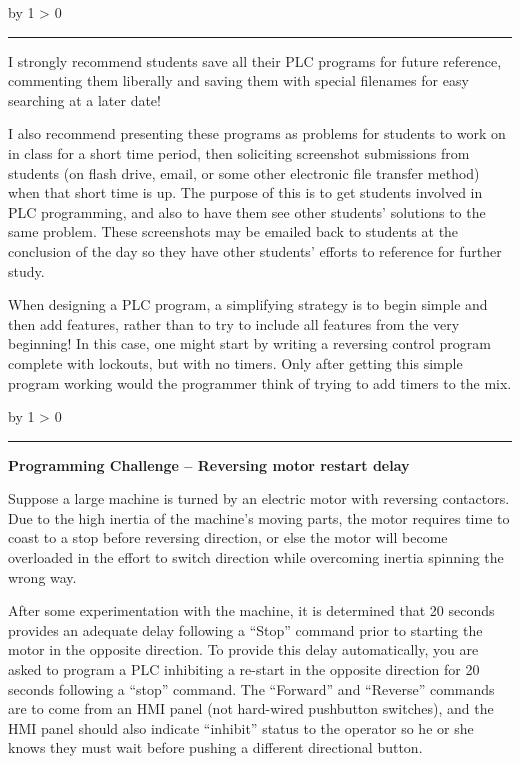 \documentclass[12pt,a4paper]{article}
\def\oppgave{
            \advance\questnum by 1
            \ifnum \questnum > 0
                 \hrule
                 \vskip 3pt
                 \leftline{Oppgave \the\questnum}
                 \vskip 3pt \fi}
\def\notes{
           \advance\explnum by 1
           \ifnum \explnum > 0
                \hrule
                \vskip 3pt
                \leftline{Notes \the\explnum}
                \vskip 3pt \fi}
\begin{document}
\notes{} 

I strongly recommend students save all their PLC programs for future reference, commenting them liberally and saving them with special filenames for easy searching at a later date!

\vskip 10pt

I also recommend presenting these programs as problems for students to work on in class for a short time period, then soliciting screenshot submissions from students (on flash drive, email, or some other electronic file transfer method) when that short time is up.  The purpose of this is to get students involved in PLC programming, and also to have them see other students' solutions to the same problem.  These screenshots may be emailed back to students at the conclusion of the day so they have other students' efforts to reference for further study.

\vskip 10pt

When designing a PLC program, a simplifying strategy is to begin simple and then add features, rather than to try to include all features from the very beginning!  In this case, one might start by writing a reversing control program complete with lockouts, but with no timers.  Only after getting this simple program working would the programmer think of trying to add timers to the mix.


\vfil \eject 



\oppgave{} 

\noindent
{\bf Programming Challenge -- Reversing motor restart delay} 

\vskip 10pt

Suppose a large machine is turned by an electric motor with reversing contactors.  Due to the high inertia of the machine's moving parts, the motor requires time to coast to a stop before reversing direction, or else the motor will become overloaded in the effort to switch direction while overcoming inertia spinning the wrong way.  

After some experimentation with the machine, it is determined that 20 seconds provides an adequate delay following a ``Stop'' command prior to starting the motor in the opposite direction.  To provide this delay automatically, you are asked to program a PLC inhibiting a re-start in the opposite direction for 20 seconds following a ``stop'' command.  The ``Forward'' and ``Reverse'' commands are to come from an HMI panel (not hard-wired pushbutton switches), and the HMI panel should also indicate ``inhibit'' status to the operator so he or she knows they must wait before pushing a different directional button.
\end{document}

